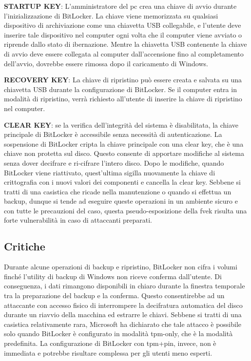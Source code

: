 \textbf{STARTUP KEY}: L'amministratore del \acrshort{pc} crea una chiave di avvio durante l'inizializzazione di BitLocker. La chiave viene memorizzata su qualsiasi dispositivo di archiviazione come una chiavetta USB collegabile, e l'utente deve inserire tale dispositivo nel computer ogni volta che il computer viene avviato o riprende dallo stato di ibernazione. Mentre la chiavetta USB contenente la chiave di avvio deve essere collegata al computer dall'accensione fino al completamento dell'avvio, dovrebbe essere rimossa dopo il caricamento di Windows.

\textbf{RECOVERY KEY}: La chiave di ripristino può essere creata e salvata su una chiavetta USB durante la configurazione di BitLocker. Se il computer entra in modalità di ripristino, verrà richiesto all'utente di inserire la chiave di ripristino nel computer.

\textbf{CLEAR KEY}: se la verifica dell'integrità del sistema è disabilitata, la chiave principale di BitLocker è accessibile senza necessità di autenticazione. La sospensione di BitLocker cripta la chiave principale con una clear key, che è una chiave non protetta sul disco. Questo consente di apportare modifiche al sistema senza dover decifrare e ri-cifrare l'intero disco. Dopo le modifiche, quando BitLocker viene riattivato, quest'ultima sigilla nuovamente la chiave di crittografia con i nuovi valori dei componenti e cancella la clear key. Sebbene si tratti di una casistica che ricade nella manutenzione o quando si effettua un backup, dunque si tende ad eseguire queste operazioni in un ambiente sicuro e con tutte le precauzioni del caso, questa pseudo-esposizione della \acrshort{fvek} risulta una forte vulnerabilità in caso di attaccanti preparati.

\subsection{Critiche}\label{subsec:critiche}

Durante alcune operazioni di backup e ripristino, BitLocker non cifra i volumi finché l’utility di backup di Windows non riceve conferma dall’utente. Di conseguenza, i dati rimangono disponibili in chiaro durante la finestra temporale tra la preparazione del backup e la conferma. Questo consentirebbe ad un attaccante con accesso fisico di interrompere la decifratura automatica del disco durante un riavvio della macchina ed estrarre le chiavi. Sebbene si tratti di una casistica relativamente rara, Microsoft ha dichiarato che tale attacco è possibile solo quando BitLocker è configurato in modalità \acrshort{tpm}-only, che è la modalità predefinita. La configurazione di BitLocker con \acrshort{tpm}+\acrshort{pin}, invece, non è immediata e potrebbe risultare complessa per gli utenti meno esperti.

